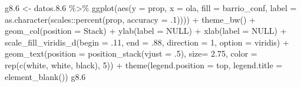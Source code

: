 \documentclass[
  12pt,
]{book}
\newenvironment{Shaded}{\begin{snugshade}}{\end{snugshade}}
\newcommand{\AttributeTok}[1]{\textcolor[rgb]{0.77,0.63,0.00}{#1}}
\newcommand{\ConstantTok}[1]{\textcolor[rgb]{0.00,0.00,0.00}{#1}}
\newcommand{\DecValTok}[1]{\textcolor[rgb]{0.00,0.00,0.81}{#1}}
\newcommand{\FloatTok}[1]{\textcolor[rgb]{0.00,0.00,0.81}{#1}}
\newcommand{\FunctionTok}[1]{\textcolor[rgb]{0.00,0.00,0.00}{#1}}
\newcommand{\NormalTok}[1]{#1}
\newcommand{\OtherTok}[1]{\textcolor[rgb]{0.56,0.35,0.01}{#1}}
\newcommand{\SpecialCharTok}[1]{\textcolor[rgb]{0.00,0.00,0.00}{#1}}
\newcommand{\StringTok}[1]{\textcolor[rgb]{0.31,0.60,0.02}{#1}}
\begin{document}
\begin{Shaded}
\begin{Highlighting}[]
\NormalTok{g8}\FloatTok{.6} \OtherTok{\textless{}{-}}\NormalTok{ datos.}\FloatTok{8.6} \SpecialCharTok{\%\textgreater{}\%} 
  \FunctionTok{ggplot}\NormalTok{(}\FunctionTok{aes}\NormalTok{(}\AttributeTok{y =}\NormalTok{ prop, }\AttributeTok{x =}\NormalTok{ ola, }\AttributeTok{fill =}\NormalTok{ barrio\_conf, }
             \AttributeTok{label =} \FunctionTok{as.character}\NormalTok{(scales}\SpecialCharTok{::}\FunctionTok{percent}\NormalTok{(prop, }\AttributeTok{accuracy =}\NormalTok{ .}\DecValTok{1}\NormalTok{)))) }\SpecialCharTok{+} 
  \FunctionTok{theme\_bw}\NormalTok{() }\SpecialCharTok{+} 
  \FunctionTok{geom\_col}\NormalTok{(}\AttributeTok{position =} \StringTok{\textquotesingle{}Stack\textquotesingle{}}\NormalTok{) }\SpecialCharTok{+}
  \FunctionTok{ylab}\NormalTok{(}\AttributeTok{label =} \ConstantTok{NULL}\NormalTok{) }\SpecialCharTok{+}
  \FunctionTok{xlab}\NormalTok{(}\AttributeTok{label =} \ConstantTok{NULL}\NormalTok{) }\SpecialCharTok{+}
  \FunctionTok{scale\_fill\_viridis\_d}\NormalTok{(}\AttributeTok{begin =}\NormalTok{ .}\DecValTok{11}\NormalTok{, }\AttributeTok{end =}\NormalTok{ .}\DecValTok{88}\NormalTok{, }\AttributeTok{direction =} \DecValTok{1}\NormalTok{, }\AttributeTok{option =} \StringTok{\textquotesingle{}viridis\textquotesingle{}}\NormalTok{) }\SpecialCharTok{+}
  \FunctionTok{geom\_text}\NormalTok{(}\AttributeTok{position =} \FunctionTok{position\_stack}\NormalTok{(}\AttributeTok{vjust =}\NormalTok{ .}\DecValTok{5}\NormalTok{),}
            \AttributeTok{size=} \FloatTok{2.75}\NormalTok{, }\AttributeTok{color =} \FunctionTok{rep}\NormalTok{(}\FunctionTok{c}\NormalTok{(}\StringTok{\textquotesingle{}white\textquotesingle{}}\NormalTok{, }\StringTok{\textquotesingle{}white\textquotesingle{}}\NormalTok{, }\StringTok{\textquotesingle{}black\textquotesingle{}}\NormalTok{), }\DecValTok{5}\NormalTok{)) }\SpecialCharTok{+} 
  \FunctionTok{theme}\NormalTok{(}\AttributeTok{legend.position =} \StringTok{\textquotesingle{}top\textquotesingle{}}\NormalTok{,}
        \AttributeTok{legend.title =} \FunctionTok{element\_blank}\NormalTok{())}
\NormalTok{g8}\FloatTok{.6}
\end{Highlighting}
\end{Shaded}
\end{document}
